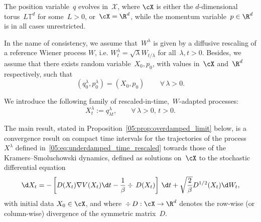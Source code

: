 The position variable~$q$ evolves in~$\mathcal X$, where $\cX$ is either the $d$-dimensional torus~$L\mathbb T^d$ for some~$L>0$, or~$\cX=\R^d$, while the momentum variable~$p\in\R^d$ is in all cases unrestricted.



In the name of consistency, we assume that~$W^\lambda$ is given by a diffusive rescaling of a reference Wiener process $W$, i.e. $W_t^\lambda = \sqrt{\lambda}W_{t/\lambda}$ for all~$\lambda,t>0$. Besides, we assume that there exists random variable~$X_0,p_0$, with values in~$\cX$ and~$\R^d$ respectively, such that
\begin{equation}
    \label{05:eq:initial_conditions}
    (q_0^\lambda,p_0^\lambda)=(X_0,p_0)\,\qquad \forall\,\lambda >0.
\end{equation}

We introduce the following family of rescaled-in-time,~$W$-adapted processes:
\begin{equation}
    \label{05:eq:underdamped_time_rescaled}
    X_t^\lambda := q_{\lambda t}^\lambda,\qquad\forall\,\lambda>0,\,t>0.
\end{equation}

The main result, stated in Proposition~\ref{05:prop:overdamped_limit} below, is a convergence result on compact time intervals for the trajectories of the process~$X^\lambda$ defined in~\eqref{05:eq:underdamped_time_rescaled} towards those of the Kramers--Smoluchowski dynamics, defined as solutions on~$\cX$ to the stochastic differential equation
\begin{equation}
    \label{05:eq:overdamped_friction_dependent}
    \d X_t = -\left[D(X_t)\nabla V(X_t)\d t - \frac1\beta\div\, D(X_t)\right]\,\d t + \sqrt{\frac{2}{\beta}}D^{1/2}(X_t)\d W_t,
\end{equation}
with initial data $X_0\in\cX$, and where~$\div\,D:\cX\to\R^d$ denotes the row-wise (or column-wise) divergence of the symmetric matrix~$D$.

